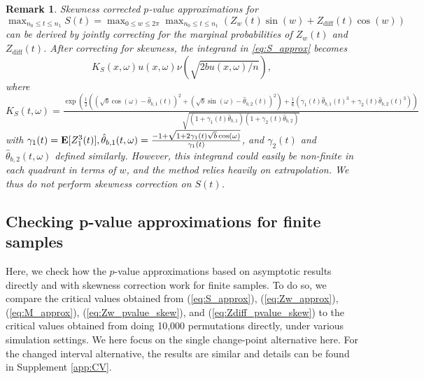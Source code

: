\documentclass[arxiv, preprint]{imsart}
\numberwithin{equation}{section}
\theoremstyle{plain}
\newtheorem{remark}[thm]{Remark}
\begin{document}
\begin{remark} \label{rmk: S_skew} Skewness corrected $p$-value approximations for \\$\max_{n_0 \le t \le n_1} S(t) = \max_{0\leq w\leq 2\pi} \max_{n_0 \le t \le n_1}  (Z_w(t) \sin(w) + Z_{\text{diff}}(t) \cos(w))$  can be derived by jointly correcting for the marginal probabilities of  $Z_w(t)$ and $Z_\text{diff}(t)$.
After correcting for skewness, the integrand in \eqref{eq:S_approx} becomes $$K_S(x, \omega)u(x,\omega) \nu(\sqrt{2bu(x,\omega)/n}),$$ where \\
$ K_S(t,\omega) = \tfrac{\exp \left( \frac{1}{2} \left((\sqrt{b}\cos(\omega) - \hat{\theta}_{b,1}(t))^2 + (\sqrt{b}\sin(\omega) - \hat{\theta}_{b,2}(t))^2\right) + \frac{1}{6}(\gamma_1(t)\hat{\theta}_{b,1}(t)^3 + \gamma_2(t)\hat{\theta}_{b,2}(t)^3) \right)}{\sqrt{(1+\gamma_1(t)\hat{\theta}_{b,1})(1+\gamma_2(t)\hat{\theta}_{b,2})}}$
with $\gamma_1(t) = \mathbf{E}[Z^3_1(t)],  \hat{\theta}_{b,1}(t,\omega) = \frac{-1 + \sqrt{1+2 \gamma_1(t)\sqrt{b}\cos(\omega)}}{\gamma_1(t)} $, and $\gamma_2(t)$ and $\hat{\theta}_{b,2}(t,\omega)$ defined similarly.   However, this integrand could easily be non-finite in each quadrant in terms of $w$, and the method relies heavily on extrapolation. We thus do not perform skewness correction on $S(t)$. 
\end{remark}

\subsection{Checking p-value approximations for finite samples}
\label{sec:4.4}

Here, we check how the $p$-value approximations based on asymptotic results directly and with skewness correction work for finite samples. To do so, we compare the critical values obtained from (\ref{eq:S_approx}), (\ref{eq:Zw_approx}), (\ref{eq:M_approx}), (\ref{eq:Zw_pvalue_skew}), and (\ref{eq:Zdiff_pvalue_skew}) to the critical values obtained from doing 10,000 permutations directly, under various simulation settings. We here focus on the single change-point alternative here. For the changed interval alternative, the results are similar and details can be found in Supplement \ref{app:CV}. %
\end{document}
